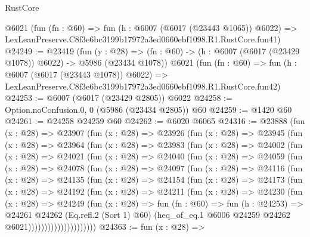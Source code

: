 \begin{lexlean}{RustCore}
\begin{coremodule}
    @6021
    (fun (fn : @60) =>
    fun (h : @6007 (@6017 (@23443 @1065)) @6022) =>
    LexLeanPreserve.C8f3e6bc3199b17972a3ed0660ebf1098.R1.RustCore.fun41)
@24249 := @23419
    (fun (y : @28) =>
    (fn : @60) -> (h : @6007 (@6017 (@23429 @1078)) @6022) -> @5986 (@23434 @1078))
    @6021
    (fun (fn : @60) =>
    fun (h : @6007 (@6017 (@23443 @1078)) @6022) =>
    LexLeanPreserve.C8f3e6bc3199b17972a3ed0660ebf1098.R1.RustCore.fun42)
@24253 := @6007 (@6017 (@23429 @2805)) @6022
@24258 := Option.noConfusion.{0, 0} (@5986 (@23434 @2805)) @60
@24259 := @1420 @60
@24261 := @24258 @24259 @60
@24262 := @6020 @6065
@24316 := @23888
    (fun (x : @28) =>
    @23907
      (fun (x : @28) =>
      @23926
        (fun (x : @28) =>
        @23945
          (fun (x : @28) =>
          @23964
            (fun (x : @28) =>
            @23983
              (fun (x : @28) =>
              @24002
                (fun (x : @28) =>
                @24021
                  (fun (x : @28) =>
                  @24040
                    (fun (x : @28) =>
                    @24059
                      (fun (x : @28) =>
                      @24078
                        (fun (x : @28) =>
                        @24097
                          (fun (x : @28) =>
                          @24116
                            (fun (x : @28) =>
                            @24135
                              (fun (x : @28) =>
                              @24154
                                (fun (x : @28) =>
                                @24173
                                  (fun (x : @28) =>
                                  @24192
                                    (fun (x : @28) =>
                                    @24211
                                      (fun (x : @28) =>
                                      @24230
                                        (fun (x : @28) =>
                                        @24249
                                          (fun (x : @28) =>
                                          fun (fn : @60) =>
                                          fun (h : @24253) =>
                                          @24261
                                            @24262
                                            (Eq.refl.{2} (Sort 1) @60)
                                            (heq_of_eq.{1}
                                              @6006
                                              @24259
                                              @24262
                                              @6021)))))))))))))))))))))
@24363 := fun (x : @28) =>

\end{coremodule}
\end{lexlean}
